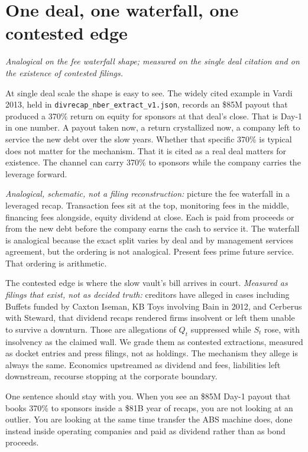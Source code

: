 \section{One deal, one waterfall, one contested edge}

\textit{Analogical on the fee waterfall shape; measured on the single deal citation and on the existence of contested filings.}

At single deal scale the shape is easy to see. The widely cited example in Vardi 2013, held in \texttt{divrecap\_nber\_extract\_v1.json}, records an \$85M payout that produced a 370\% return on equity for sponsors at that deal's close. That is Day-1 in one number. A payout taken now, a return crystallized now, a company left to service the new debt over the slow years. Whether that specific 370\% is typical does not matter for the mechanism. That it is cited as a real deal matters for existence. The channel can carry 370\% to sponsors while the company carries the leverage forward.

\textit{Analogical, schematic, not a filing reconstruction:} picture the fee waterfall in a leveraged recap. Transaction fees sit at the top, monitoring fees in the middle, financing fees alongside, equity dividend at close. Each is paid from proceeds or from the new debt before the company earns the cash to service it. The waterfall is analogical because the exact split varies by deal and by management services agreement, but the ordering is not analogical. Present fees prime future service. That ordering is arithmetic.

The contested edge is where the slow vault's bill arrives in court. \textit{Measured as filings that exist, not as decided truth:} creditors have alleged in cases including Buffets funded by Caxton Iseman, KB Toys involving Bain in 2012, and Cerberus with Steward, that dividend recaps rendered firms insolvent or left them unable to survive a downturn. Those are allegations of $Q_t$ suppressed while $S_t$ rose, with insolvency as the claimed wall. We grade them as contested extractions, measured as docket entries and press filings, not as holdings. The mechanism they allege is always the same. Economics upstreamed as dividend and fees, liabilities left downstream, recourse stopping at the corporate boundary.

One sentence should stay with you. When you see an \$85M Day-1 payout that books 370\% to sponsors inside a \$81B year of recaps, you are not looking at an outlier. You are looking at the same time transfer the ABS machine does, done instead inside operating companies and paid as dividend rather than as bond proceeds.

